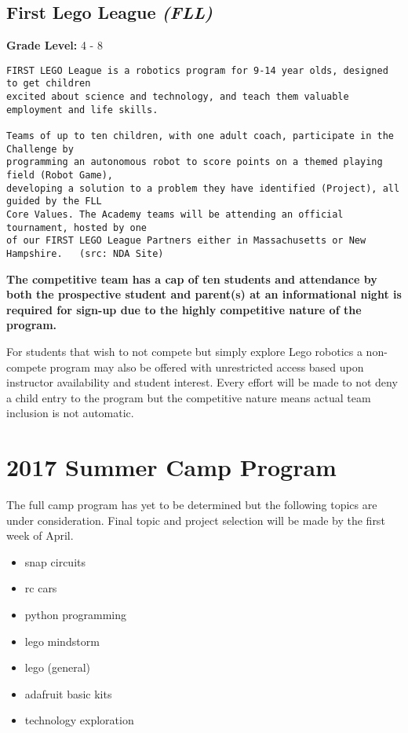 \documentclass{article}
\begin{document}
\subsection*{First Lego League \textit{(FLL)}}
\textbf{Grade Level:} 4 - 8
\begingroup
    \fontsize{10pt}{12pt}\selectfont
    \begin{verbatim} 
FIRST LEGO League is a robotics program for 9-14 year olds, designed to get children 
excited about science and technology, and teach them valuable employment and life skills.

Teams of up to ten children, with one adult coach, participate in the Challenge by 
programming an autonomous robot to score points on a themed playing field (Robot Game), 
developing a solution to a problem they have identified (Project), all guided by the FLL 
Core Values. The Academy teams will be attending an official tournament, hosted by one 
of our FIRST LEGO League Partners either in Massachusetts or New Hampshire.   (src: NDA Site)
\end{verbatim}
\endgroup

\textbf{The competitive team has a cap of ten students and attendance by both the prospective student and parent(s) at an informational night is required for sign-up due to the highly competitive nature of the program.}

 For students that wish to not compete but simply explore Lego robotics a non-compete program may also be offered with unrestricted access based upon instructor availability and student interest. Every effort will be made to not deny a child entry to the program but the competitive nature means actual team inclusion is not automatic.

\section*{2017 Summer Camp Program}
The full camp program has yet to be determined but the following topics are under consideration. Final topic and project selection will be made by the first week of April.

\begin{itemize}
\item snap circuits
\item rc cars
\item python programming
\item lego mindstorm
\item lego (general)
\item adafruit basic kits
\item technology exploration
\end{itemize}
\end{document}
